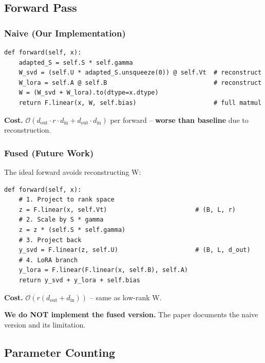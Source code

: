 \subsection{Forward Pass}

\subsubsection{Naive (Our Implementation)}

\begin{lstlisting}
def forward(self, x):
    adapted_S = self.S * self.gamma
    W_svd = (self.U * adapted_S.unsqueeze(0)) @ self.Vt  # reconstruct
    W_lora = self.A @ self.B                             # reconstruct
    W = (W_svd + W_lora).to(dtype=x.dtype)
    return F.linear(x, W, self.bias)                     # full matmul
\end{lstlisting}

\textbf{Cost.} $\mathcal{O}(d_\text{out} \cdot r \cdot d_\text{in} + d_\text{out} \cdot d_\text{in})$ 
per forward -- \textbf{worse than baseline} due to reconstruction.

\subsubsection{Fused (Future Work)}

The ideal forward avoids reconstructing W:

\begin{lstlisting}
def forward(self, x):
    # 1. Project to rank space
    z = F.linear(x, self.Vt)                        # (B, L, r)
    # 2. Scale by S * gamma
    z = z * (self.S * self.gamma)
    # 3. Project back
    y_svd = F.linear(z, self.U)                     # (B, L, d_out)
    # 4. LoRA branch
    y_lora = F.linear(F.linear(x, self.B), self.A)
    return y_svd + y_lora + self.bias
\end{lstlisting}

\textbf{Cost.} $\mathcal{O}(r(d_\text{out} + d_\text{in}))$ -- same as low-rank W.

\textbf{We do NOT implement the fused version.} The paper documents the naive 
version and its limitation.

\subsection{Parameter Counting}

